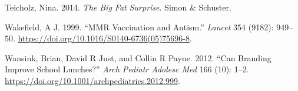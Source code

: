 \documentclass[
  12pt,
]{book}
\newlength{\cslhangindent}
\newlength{\cslentryspacingunit} %
\newenvironment{CSLReferences}[2] %
 {%
  \setlength{\parindent}{0pt}
  \ifodd #1
  \let\oldpar\par
  \def\par{\hangindent=\cslhangindent\oldpar}
  \fi
  \setlength{\parskip}{#2\cslentryspacingunit}
 }%
 {}
\begin{document}
\begin{CSLReferences}{1}{0}
\leavevmode{}%
Teicholz, Nina. 2014. \emph{The Big Fat Surprise}. Simon \& Schuster.

\leavevmode{}%
Wakefield, A J. 1999. {``MMR Vaccination and Autism.''} \emph{Lancet} 354 (9182): 949--50. \url{https://doi.org/10.1016/S0140-6736(05)75696-8}.

\leavevmode{}%
Wansink, Brian, David R Just, and Collin R Payne. 2012. {``Can Branding Improve School Lunches?''} \emph{Arch Pediatr Adolesc Med} 166 (10): 1--2. \url{https://doi.org/10.1001/archpediatrics.2012.999}.

\end{CSLReferences}
\end{document}
